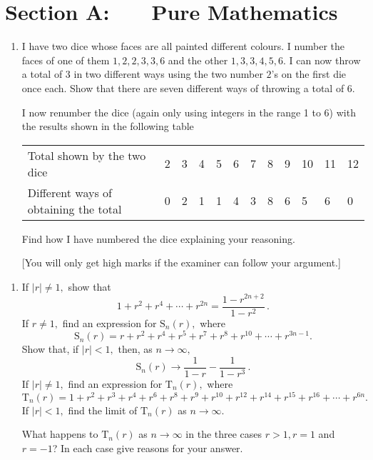 \documentclass[a4, 11pt]{report}
\newlength{\qspace}
\newcounter{qnumber}
\newenvironment{question}%
 {\vspace{\qspace}
  \begin{enumerate}[\bfseries 1\quad][10]%
    \setcounter{enumi}{\value{qnumber}}%
    \item%
 }
{
  \end{enumerate}
  \filbreak
  \stepcounter{qnumber}
 }
\begin{document}
\setcounter{page}{2}

 
\section*{Section A: \ \ \ Pure Mathematics}

\begin{question}
I have two dice whose faces are all painted different colours. I number
the faces of one of them $1,2,2,3,3,6$ and the other $1,3,3,4,5,6.$
I can now throw a total of 3 in two different ways using the two number
$2$'s on the first die once each. Show that there are seven different
ways of throwing a total of 6. 


I now renumber the dice (again only using integers in the range 1
to 6) with the results shown in the following table 


\noindent \begin{center}
\begin{tabular}{llllllllllll}
Total shown by the two dice & 2 & 3 & 4 & 5 & 6 & 7 & 8 & 9 & 10 & 11 & 12\tabularnewline
Different ways of obtaining the total & 0 & 2 & 1 & 1 & 4 & 3 & 8 & 6 & 5 & 6 & 0\tabularnewline
\end{tabular}
\par\end{center}


Find how I have numbered the dice explaining your reasoning. 


{[}You will only get high marks if the examiner can follow your argument.{]} 
\end{question}

\begin{question}
If $\left|r\right|\neq1,$ show that 
\[
1+r^{2}+r^{4}+\cdots+r^{2n}=\frac{1-r^{2n+2}}{1-r^{2}}\,.
\]
If $r\neq1,$ find an expression for $\mathrm{S}_{n}(r),$ where 
\[
\mathrm{S}_{n}(r)=r+r^{2}+r^{4}+r^{5}+r^{7}+r^{8}+r^{10}+\cdots+r^{3n-1}.
\]
Show that, if $\left|r\right|<1,$ then, as $n\rightarrow\infty,$
\[
\mathrm{S}_{n}(r)\rightarrow\frac{1}{1-r}-\frac{1}{1-r^{3}}\,.
\]
If $\left|r\right|\neq1,$ find an expression for $\mathrm{T}_{n}(r),$
where 
\[
\mathrm{T}_{n}(r)=1+r^{2}+r^{3}+r^{4}+r^{6}+r^{8}+r^{9}+r^{10}+r^{12}+r^{14}+r^{15}+r^{16}+\cdots+r^{6n}.
\]
If $\left|r\right|<1,$ find the limit of $\mathrm{T}_{n}(r)$ as
$n\rightarrow\infty.$


What happens to $\mathrm{T}_{n}(r)$ as $n\rightarrow\infty$ in the
three cases $r>1,r=1$ and $r=-1$? In each case give reasons for
your answer. 
\end{question}
\end{document}
